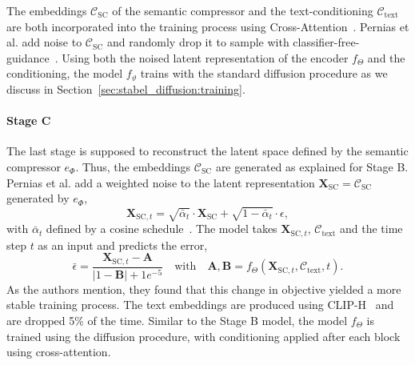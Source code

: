 The embeddings $\mathcal{C}_{\text{SC}}$ of the semantic compressor and the
text-conditioning $\mathcal{C}_{\text{text}}$ are both incorporated into the training process using Cross-Attention~\cite{vaswani2023attentionneed}.
Pernias et al. add noise to $\mathcal{C}_{\text{SC}}$ and randomly drop it to
sample with classifier-free-guidance~\cite{ho2022classifierfreediffusionguidance}.
Using both the noised latent representation of the encoder $f_\Theta$ and the
conditioning, the model $f_\vartheta$ trains with the standard diffusion
procedure as we discuss in Section~\ref{sec:stabel_diffusion:training}.

\paragraph*{Stage C} The last stage is supposed to reconstruct the latent space
defined by the semantic compressor $e_\Phi$. Thus, the embeddings
$\mathcal{C}_{\text{SC}}$ are generated as explained for Stage B. Pernias et
al. add a weighted noise to the latent representation
$\boldsymbol{X}_{\text{SC}} = \mathcal{C}_{\text{SC}}$ generated by $e_\Phi$,
\begin{equation}
    \boldsymbol{X}_{\text{SC}, t} = \sqrt{\bar{\alpha}_t}\cdot\boldsymbol{X}_{\text{SC}}+\sqrt{1-\bar{\alpha}_t}\cdot\epsilon,
\end{equation}
with $\bar{\alpha}_t$ defined by a cosine schedule~\cite{Nichol2021ImprovedDenoisingDiffusionProbabilisticModels}.
The model takes $\boldsymbol{X}_{\text{SC}, t}$, $\mathcal{C}_{\text{text}}$ and
the time step $t$ as an input and predicts the error,
\begin{equation}
    \bar{\epsilon} = \frac{\boldsymbol{X}_{\text{SC}, t} - \boldsymbol{A}}{|1-\boldsymbol{B}| + 1e^{-5}} \quad \text{with} \quad \boldsymbol{A}, \boldsymbol{B} = f_\Theta(\boldsymbol{X}_{\text{SC}, t},\mathcal{C}_{\text{text}}, t).
\end{equation}
As the authors mention, they found that this change in objective yielded a more
stable training process. The text embeddings are produced using
CLIP-H~\cite{Ilharco2021OpenCLIP} and are dropped 5\% of the time. Similar to 
the Stage B model, the model $f_\Theta$ is trained using the diffusion
procedure, with conditioning applied after each block using cross-attention.